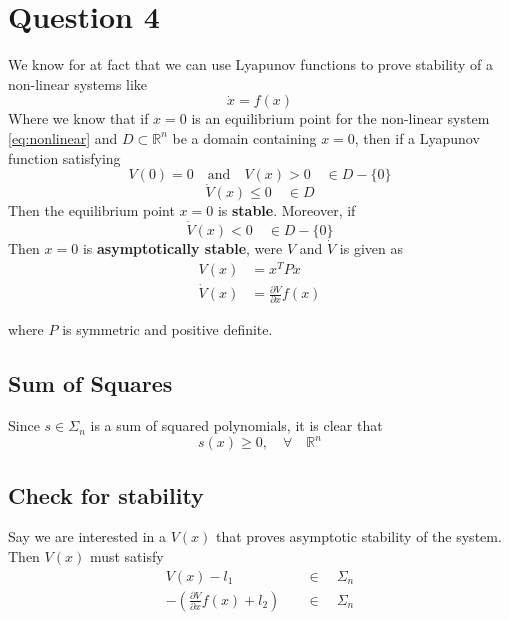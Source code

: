 \chapter{Question 4}
We know for at fact that we can use Lyapunov functions to prove stability of a non-linear systems like
\begin{equation}
        \dot{x} = f(x)
        \label{eq:nonlinear}
\end{equation}
Where we know that if $x = 0$ is an equilibrium point for the non-linear system \ref{eq:nonlinear} and $D \subset \mathbb{R}^n$ be a domain containing $x = 0$, then if a Lyapunov function satisfying
\begin{equation}
        V(0) = 0 \quad \text{and} \quad V(x) > 0 \quad \in D - \{0\}
\end{equation}
\begin{equation}
        \dot{V}(x) \leq 0 \quad \in D
\end{equation}
Then the equilibrium point $x = 0$ is \textbf{stable}. Moreover, if
\begin{equation}
        \dot{V}(x) < 0 \quad \in D - \{0\}
\end{equation}
Then $x = 0$ is \textbf{asymptotically stable}, were $V$ and $\dot{V}$ is given as
\begin{equation}
        \begin{split}
                V(x) &= x^T P x \\
                \dot{V}(x) &= \frac{\partial V}{\partial x} f(x)
        \end{split}
\end{equation}

where $P$ is symmetric and positive definite.

\section*{Sum of Squares}
Since $s \in \Sigma_{n}$ is a sum of squared polynomials, it is clear that 
\begin{equation}
        s(x) \geq 0, \quad \forall \quad \mathbb{R}^n
\end{equation}

\section*{Check for stability}
Say we are interested in a $V(x)$ that proves asymptotic stability of the system. Then $V(x)$ must satisfy
\begin{equation}
        \begin{split}
                V(x) - l_1 \quad &\in \quad \Sigma_n \\
                -\left(\frac{\partial V}{\partial x} f(x) + l_2 \right) \quad &\in \quad \Sigma_n
        \end{split}
\end{equation}